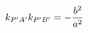 \documentclass[preview]{standalone}
\begin{document}
\begin{align*}
\special{dvisvgm:raw <g id='unique000'>}k_{P'A'}k_{P'B'}=-\frac{b^2}{a^2}\special{dvisvgm:raw </g>}
\end{align*}
\end{document}
